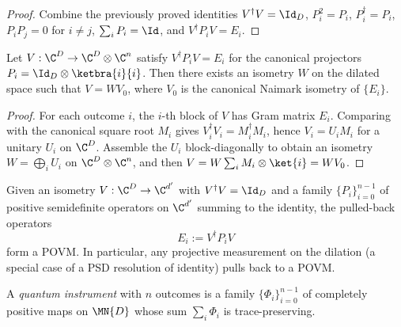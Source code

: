 \begin{proof}
    \leanok
    Combine the previously proved identities $V^\dagger V = \Id_D$,
    $P_i^2 = P_i$, $P_i^\dagger = P_i$, $P_i P_j = 0$ for $i \ne j$,
    $\sum_i P_i = \Id$, and $V^\dagger P_i V = E_i$.
\end{proof}

\begin{theorem}
    \label{thm:naimark_concrete_uniqueness}
    \leanok
    Let $V : \C^D \to \C^D \otimes \C^n$ satisfy
    $V^\dagger P_i V = E_i$ for the canonical projectors
    $P_i = \Id_D \otimes \ketbra{i}{i}$.
    Then there exists an isometry $W$ on the dilated space such that
    $V = W V_0$, where $V_0$ is the canonical Naimark isometry of $\{E_i\}$.
\end{theorem}

\begin{proof}
    \leanok
    For each outcome $i$, the $i$-th block of $V$ has Gram matrix $E_i$.
    Comparing with the canonical square root $M_i$ gives
    $V_i^\dagger V_i = M_i^\dagger M_i$, hence $V_i = U_i M_i$ for a unitary
    $U_i$ on $\C^D$. Assemble the $U_i$ block-diagonally to obtain an
    isometry $W = \bigoplus_i U_i$ on $\C^D \otimes \C^n$, and then
    $V = W \sum_i M_i \otimes \ket{i} = W V_0$.
\end{proof}

\begin{definition}
    \label{def:povm_of_psd_resolution_of_identity}
    \leanok
    Given an isometry $V : \C^D \to \C^{d'}$ with $V^\dagger V = \Id_D$
    and a family $\{P_i\}_{i=0}^{n-1}$ of positive semidefinite operators on
    $\C^{d'}$ summing to the identity, the pulled-back operators
    \[
        E_i := V^\dagger P_i V
    \]
    form a POVM. In particular, any projective measurement on the
    dilation (a special case of a PSD resolution of identity) pulls back
    to a POVM.
\end{definition}

\begin{definition}\label{def:instrument}
    \leanok
    A \emph{quantum instrument} with $n$ outcomes is a family
    $\{\Phi_i\}_{i=0}^{n-1}$ of completely positive maps on $\MN{D}$ whose
    sum $\sum_i \Phi_i$ is trace-preserving.
\end{definition}

